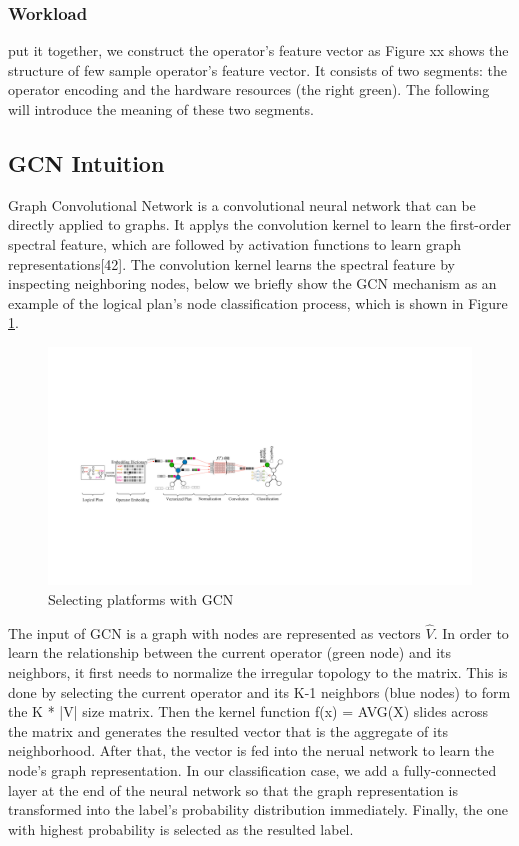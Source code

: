 \subsubsection{Workload}


put it together, we construct the operator's feature vector as 
Figure xx shows the structure of few sample operator's feature vector. 
It consists of two segments: the operator encoding and the hardware resources (the right green). 
The following will introduce the meaning of these two segments.


\subsection{GCN Intuition}

Graph Convolutional Network is a convolutional neural network that can be directly applied to graphs. 
It applys the convolution kernel to learn the first-order spectral feature, which are followed by activation functions to learn graph representations[42]. 
The convolution kernel learns the spectral feature by inspecting neighboring nodes, below we briefly show the GCN mechanism as an example of the logical plan's node classification process, which is shown in Figure \ref{fig:gcn}.

\begin{figure}
  \centering
  \includegraphics[width=\linewidth]{figures/GCN-new.pdf}
  \caption{Selecting platforms with GCN}
  \label{fig:gcn}
\end{figure}

The input of GCN is a graph with nodes are represented as vectors $\hat{V}$. 
In order to learn the relationship between the current operator (green node) and its neighbors, it first needs to normalize the irregular topology to the matrix. 
This is done by selecting the current operator and its K-1 neighbors (blue nodes) to form the K * |V| size matrix. 
Then the kernel function f(x) = AVG(X) slides across the matrix and generates the resulted vector that is the aggregate of its neighborhood. 
After that, the vector is fed into the nerual network to learn the node's graph representation. 
In our classification case, we add a fully-connected layer at the end of the neural network so that the graph representation is transformed into the label's probability distribution immediately. 
Finally, the one with highest probability is selected as the resulted label.


